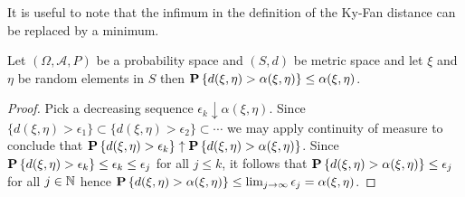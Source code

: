 It is useful to note that the infimum in the definition of the Ky-Fan distance can be replaced by a minimum.
\begin{prop}\label{KyFanAttainment}Let $(\Omega, \mathcal{A}, P)$ be a probability space and $(S,d)$ be metric space and let $\xi$ and $\eta$ be
  random elements in $S$ then $\textbf{P}\left \{d(\xi, \eta) > \alpha(\xi,\eta) \right \} \leq \alpha(\xi,\eta)$.
\end{prop}
\begin{proof}
Pick a decreasing sequence $\epsilon_k \downarrow \alpha(\xi, \eta)$.  Since $\lbrace d(\xi, \eta) > \epsilon_1 \rbrace \subset \lbrace d(\xi, \eta) > \epsilon_{2} \rbrace \subset \dotsb$ we may apply continuity of measure to conclude that $\textbf{P}\left \{d(\xi, \eta) > \epsilon_k \right \}  \uparrow \textbf{P}\left \{d(\xi, \eta) > \alpha(\xi, \eta) \right \}$.  Since $\textbf{P}\left \{d(\xi, \eta) > \epsilon_k \right \} \leq \epsilon_k \leq \epsilon_j$ for all $j \leq k$, it follows that $\textbf{P}\left \{d(\xi, \eta) > \alpha(\xi, \eta) \right \} \leq \epsilon_j$ for all $j \in \mathbb{N}$ hence $\textbf{P}\left \{d(\xi, \eta) > \alpha(\xi, \eta) \right \} \leq \lim_{j \to \infty} \epsilon_j = \alpha(\xi, \eta)$.
\end{proof}


